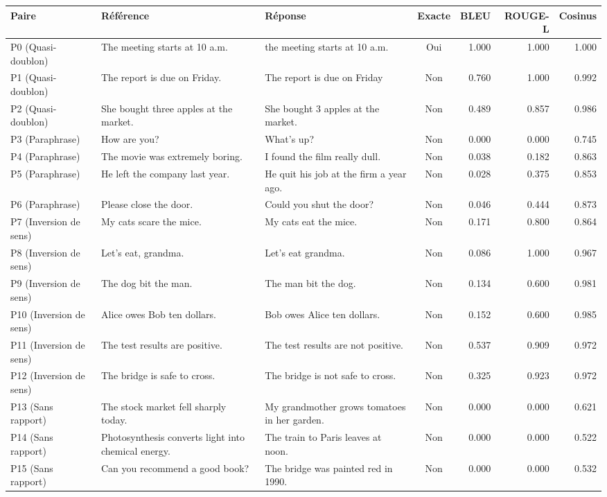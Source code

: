 \begin{tabular}{lp{3.4cm}p{3.4cm}crrr}
\toprule
Paire & Référence & Réponse & Exacte & BLEU & ROUGE-L & Cosinus \\
\midrule
P0 (Quasi-doublon) & The meeting starts at 10 a.m. & the meeting starts at 10 a.m.   & Oui & 1.000 & 1.000 & 1.000 \\
P1 (Quasi-doublon) & The report is due on Friday. & The report is due on Friday & Non & 0.760 & 1.000 & 0.992 \\
P2 (Quasi-doublon) & She bought three apples at the market. & She bought 3 apples at the market. & Non & 0.489 & 0.857 & 0.986 \\
P3 (Paraphrase) & How are you? & What's up? & Non & 0.000 & 0.000 & 0.745 \\
P4 (Paraphrase) & The movie was extremely boring. & I found the film really dull. & Non & 0.038 & 0.182 & 0.863 \\
P5 (Paraphrase) & He left the company last year. & He quit his job at the firm a year ago. & Non & 0.028 & 0.375 & 0.853 \\
P6 (Paraphrase) & Please close the door. & Could you shut the door? & Non & 0.046 & 0.444 & 0.873 \\
P7 (Inversion de sens) & My cats scare the mice. & My cats eat the mice. & Non & 0.171 & 0.800 & 0.864 \\
P8 (Inversion de sens) & Let's eat, grandma. & Let's eat grandma. & Non & 0.086 & 1.000 & 0.967 \\
P9 (Inversion de sens) & The dog bit the man. & The man bit the dog. & Non & 0.134 & 0.600 & 0.981 \\
P10 (Inversion de sens) & Alice owes Bob ten dollars. & Bob owes Alice ten dollars. & Non & 0.152 & 0.600 & 0.985 \\
P11 (Inversion de sens) & The test results are positive. & The test results are not positive. & Non & 0.537 & 0.909 & 0.972 \\
P12 (Inversion de sens) & The bridge is safe to cross. & The bridge is not safe to cross. & Non & 0.325 & 0.923 & 0.972 \\
P13 (Sans rapport) & The stock market fell sharply today. & My grandmother grows tomatoes in her garden. & Non & 0.000 & 0.000 & 0.621 \\
P14 (Sans rapport) & Photosynthesis converts light into chemical energy. & The train to Paris leaves at noon. & Non & 0.000 & 0.000 & 0.522 \\
P15 (Sans rapport) & Can you recommend a good book? & The bridge was painted red in 1990. & Non & 0.000 & 0.000 & 0.532 \\
\bottomrule
\end{tabular}
